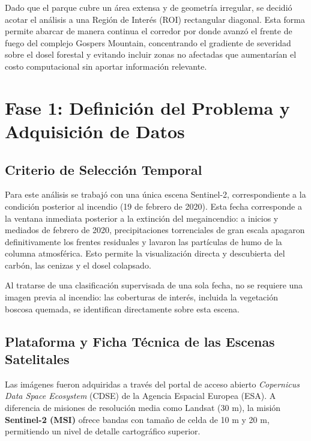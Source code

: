\documentclass[12pt]{article}
\begin{document}
Dado que el parque cubre un área extensa y de geometría irregular, se decidió acotar el análisis a una Región de Interés (ROI) rectangular diagonal. Esta forma permite abarcar de manera continua el corredor por donde avanzó el frente de fuego del complejo Gospers Mountain, concentrando el gradiente de severidad sobre el dosel forestal y evitando incluir zonas no afectadas que aumentarían el costo computacional sin aportar información relevante.

\section{Fase 1: Definición del Problema y Adquisición de Datos}

\subsection{Criterio de Selección Temporal}
Para este análisis se trabajó con una única escena Sentinel-2, correspondiente a la condición posterior al incendio (19 de febrero de 2020). Esta fecha corresponde a la ventana inmediata posterior a la extinción del megaincendio: a inicios y mediados de febrero de 2020, precipitaciones torrenciales de gran escala apagaron definitivamente los frentes residuales y lavaron las partículas de humo de la columna atmosférica. Esto permite la visualización directa y descubierta del carbón, las cenizas y el dosel colapsado.

Al tratarse de una clasificación supervisada de una sola fecha, no se requiere una imagen previa al incendio: las coberturas de interés, incluida la vegetación boscosa quemada, se identifican directamente sobre esta escena.

\subsection{Plataforma y Ficha Técnica de las Escenas Satelitales}
Las imágenes fueron adquiridas a través del portal de acceso abierto \textit{Copernicus Data Space Ecosystem} (CDSE) de la Agencia Espacial Europea (ESA). A diferencia de misiones de resolución media como Landsat (30 m), la misión \textbf{Sentinel-2 (MSI)} ofrece bandas con tamaño de celda de 10 m y 20 m, permitiendo un nivel de detalle cartográfico superior.
\end{document}
